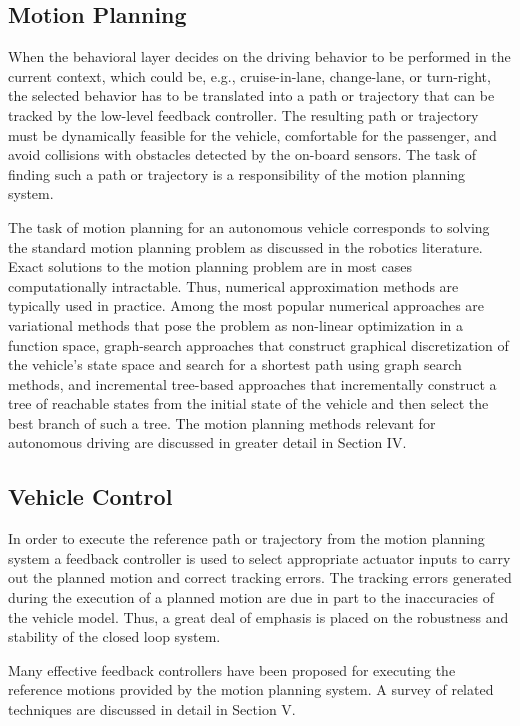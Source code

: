 \documentclass[a4paper,10pt]{article}
\begin{document}
\subsection{Motion Planning}
When the behavioral layer decides on the driving behavior to be performed in the current context, which could be, e.g., cruise-in-lane, change-lane, or turn-right, the selected behavior has to be translated into a path or trajectory that can be tracked by the low-level feedback controller. The resulting path or trajectory must be dynamically feasible for the vehicle, comfortable for the passenger, and avoid collisions with obstacles detected by the on-board sensors. The task of finding such a path or trajectory is a responsibility of the motion planning system.

The task of motion planning for an autonomous vehicle corresponds to solving the standard motion planning problem as discussed in the robotics literature. Exact solutions to the motion planning problem are in most cases computationally intractable. Thus, numerical approximation methods are typically used in practice. Among the most popular numerical approaches are variational methods that pose the problem as non-linear optimization in a function space, graph-search approaches that construct graphical discretization of the vehicle’s state space and search for a shortest path using graph search methods, and incremental tree-based approaches that incrementally construct a tree of reachable states from the initial state of the vehicle and then select the best branch of such a tree. The motion planning methods relevant for autonomous driving are discussed in greater detail in Section IV.

\subsection{Vehicle Control}
In order to execute the reference path or trajectory from the motion planning system a feedback controller is used to select appropriate actuator inputs to carry out the planned motion and correct tracking errors. The tracking errors generated during the execution of a planned motion are due in part to the inaccuracies of the vehicle model. Thus, a great deal of emphasis is placed on the robustness and stability of the closed loop system.

Many effective feedback controllers have been proposed for executing the reference motions provided by the motion planning system. A survey of related techniques are discussed in detail in Section V.
\end{document}
